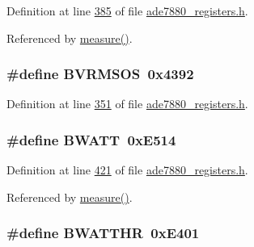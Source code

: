 Definition at line \hyperlink{a00036_source_l00385}{385} of file \hyperlink{a00036_source}{ade7880\-\_\-registers.\-h}.



Referenced by \hyperlink{a00042_source_l00040}{measure()}.

\hypertarget{a00036_a82b0238744da6064813d1974735bc64c}{
\subsubsection[{B\-V\-R\-M\-S\-O\-S}]{\setlength{\rightskip}{0pt plus 5cm}\#define B\-V\-R\-M\-S\-O\-S~0x4392}}\label{de/d8c/a00036_a82b0238744da6064813d1974735bc64c}


Definition at line \hyperlink{a00036_source_l00351}{351} of file \hyperlink{a00036_source}{ade7880\-\_\-registers.\-h}.

\hypertarget{a00036_a3a60995ae993fd06892df7023a9f496c}{
\subsubsection[{B\-W\-A\-T\-T}]{\setlength{\rightskip}{0pt plus 5cm}\#define B\-W\-A\-T\-T~0x\-E514}}\label{de/d8c/a00036_a3a60995ae993fd06892df7023a9f496c}


Definition at line \hyperlink{a00036_source_l00421}{421} of file \hyperlink{a00036_source}{ade7880\-\_\-registers.\-h}.



Referenced by \hyperlink{a00042_source_l00040}{measure()}.

\hypertarget{a00036_a185c6910fa47f7e973f0f8743ef0e8ad}{
\subsubsection[{B\-W\-A\-T\-T\-H\-R}]{\setlength{\rightskip}{0pt plus 5cm}\#define B\-W\-A\-T\-T\-H\-R~0x\-E401}}\label{de/d8c/a00036_a185c6910fa47f7e973f0f8743ef0e8ad}


